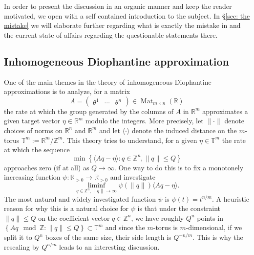 \documentclass[reqno,11pt, twoside]{amsart}
\theoremstyle{plain}
\theoremstyle{definition}
\theoremstyle{definition}
\theoremstyle{remark}
\numberwithin{equation}{section}
\newcommand{\bR}{\mathbb{R}}
\newcommand{\bZ}{\mathbb{Z}}
\newcommand{\bT}{\mathbb{T}}
\newcommand\norm[1]{\|#1\|}
\newcommand\seta[1]{\left\{#1\right\}}
\newcommand\pa[1]{\left(#1\right)}
\newcommand\idist[1]{\langle#1\rangle}
\newcommand\on[1]{\operatorname{#1}}
\newcommand\mat[1]{\pa{\begin{matrix}#1\end{matrix}}}
\begin{document}
In order to present the discussion in an organic manner and keep the reader 
motivated, we open with a self contained introduction to the subject. 
In \S\ref{sec: the mistake} we will elaborate further regarding what is exactly the mistake in \cite{GDV} and the current state of affairs regarding the questionable statements there. 


\subsection{Inhomogeneous Diophantine approximation}
One of the main themes in the theory of inhomogeneous Diophantine approximations is to analyze, for a matrix 
$$A = \mat{\theta^1&\cdots &\theta^n}\in \on{Mat}_{m\times n}(\bR)$$
the rate at 
which the group generated by the columns of $A$ in $\bR^m$ approximates a given target vector $\eta\in \bR^m$ modulo the integers. 
More precisely, let $\norm{\cdot}$ denote choices of norms on $\bR^n$ and $\bR^m$ and let $\idist{\cdot}$ denote
the induced distance on the $m$-torus $\bT^m:=\bR^m/\bZ^m$. 
This theory tries to understand, for a given $\eta\in \bT^m$ the rate at which the sequence 
$$\min\seta{\idist{Aq -\eta}:q\in \bZ^n, \norm{q} \le Q}$$ approaches zero (if at all) as $Q\to\infty$. 
One way to do this is to fix a monotonely increasing function $\psi:\bR_{>0}\to\bR_{>0}$  and investigate
\begin{equation}\label{eq: liminf}
\liminf_{q\in \bZ^n, \norm{q}\to\infty} \psi(\norm{q})\idist{Aq -\eta}.
\end{equation}
 The most natural and widely investigated function $\psi$ is $\psi(t) = t^{n/m}$. A heuristic reason for why this is a natural choice for $\psi$ is that under the constraint $\norm{q}\le Q$ on the coefficient vector $q\in \bZ^n$, we have roughly $Q^n$ points in $\seta{Aq \mod \bZ:\norm{q}\le Q}\subset \bT^m$ and since the $m$-torus is $m$-dimensional, if we split it to $Q^n$ boxes of the same size, their side length is $Q^{-n/m}$. This is why the rescaling by $Q^{n/m}$ leads to an interesting discussion.
\end{document}
